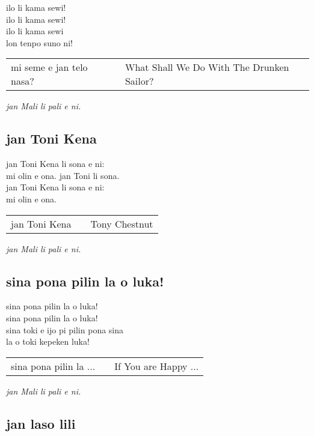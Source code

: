ilo li kama sewi! \\
ilo li kama sewi! \\
ilo li kama sewi \\
lon tenpo suno ni! 

\begin{supertabular}{p{5,5cm}|ll}
mi seme e jan telo nasa? && What Shall We Do With The Drunken Sailor? \\
\end{supertabular}

\textit{jan Mali li pali e ni. \cite{www:astrodonunt:01}}

\subsection{jan Toni Kena}

jan Toni Kena li sona e ni:  \\
mi olin e ona. jan Toni li sona.  \\
jan Toni Kena li sona e ni: \\
mi olin e ona.

\begin{supertabular}{p{5,5cm}|ll}
jan Toni Kena && Tony Chestnut \\
\end{supertabular}

\textit{jan Mali li pali e ni. \cite{www:astrodonunt:01}}

\subsection{sina pona pilin la o luka!}

sina pona pilin la o luka!  \\
sina pona pilin la o luka!  \\
sina toki e ijo pi pilin pona sina  \\
la o toki kepeken luka!

\begin{supertabular}{p{5,5cm}|ll}
sina pona pilin la ... && If You are Happy ... \\
\end{supertabular}

\textit{jan Mali li pali e ni. \cite{www:astrodonunt:01}}

\subsection{jan laso lili}

